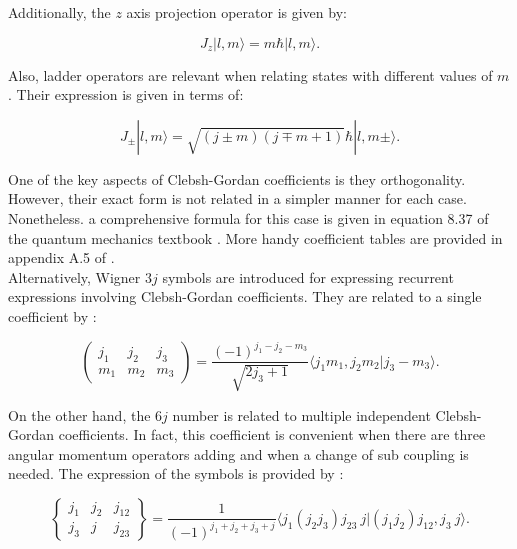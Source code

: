 \documentclass[openany]{book}
\begin{document}
Additionally, the $z$ axis projection operator is given by: 

\begin{equation}\label{eq:angularMomentum_Jz}
	J_z|l, m \rangle  =m \hbar |l, m \rangle. 
\end{equation}

Also, ladder operators are relevant when relating states with different values of $m$. Their expression is given in terms of:

\begin{equation}\label{eq:angularMomentum_Jladder}
	J_\pm|l, m \rangle  = \sqrt{(j \pm m)(j \mp m + 1)} \hbar |l, m \pm \rangle. 
\end{equation}

One of the key aspects of Clebsh-Gordan coefficients is they orthogonality. However, their exact form is not related in a simpler manner for each case. Nonetheless. a comprehensive formula for this case is given in equation 8.37 of the quantum mechanics textbook \cite{beck_2012}. More handy coefficient tables are provided in appendix A.5 of \cite{blatt_weisskopf_1952}. \\

Alternatively, Wigner $3j$ symbols are introduced for expressing recurrent expressions involving Clebsh-Gordan coefficients. They are related to a single coefficient by \cite{heyde_2004}:

\begin{equation} \label{eq:angularMomentum_Wigner_3j}
	\left(\begin{array}{ccc}
		j_1 &	j_2& j_3 \\
		m_1 & m_2 & m_3
	\end{array}\right) = \frac{(-1)^{j_1 -j_2 - m_3}}{\sqrt{2j_3 +1}}  \langle j_1 m_1, j_2 m_2| j_3 -m_3 \rangle.
\end{equation}


On the other hand, the $6j$ number is related to multiple independent Clebsh-Gordan coefficients. In fact, this coefficient is convenient when there are three angular momentum operators adding and when a change of sub coupling is needed. The expression of the symbols is provided by \cite{heyde_2004}:

\begin{equation}  \label{eq:angularMomentum_Wigner_6j}
	\left\{\begin{array}{ccc}
		j_1 & j_2 &	j_{12} \\
		j_3 & j & j_{23}
	\end{array}\right\} = \frac{1}{(-1)^{j_1+j_2+j_3+j}}  \langle j_1 (j_2j_3) j_{23} \  j | (j_1j_2) j_{12}, j_3 \ j \rangle.
\end{equation}
\end{document}
